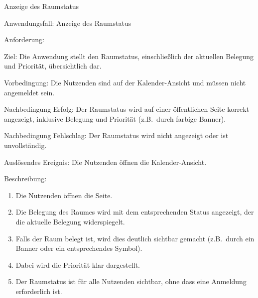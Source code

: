 \begin{function}{80}{Anzeige des Raumstatus}
    \item[Anwendungsfall:] Anzeige des Raumstatus
    \item[Anforderung:] 
    \item[Ziel:] Die Anwendung stellt den Raumstatus, einschließlich der aktuellen Belegung und Priorität, übersichtlich dar.
    \item[Vorbedingung:] Die Nutzenden sind auf der Kalender-Ansicht und müssen nicht angemeldet sein.
    \item[Nachbedingung Erfolg:] Der Raumstatus wird auf einer öffentlichen Seite korrekt angezeigt, inklusive Belegung und Priorität (z.B.\ durch farbige Banner).
    \item[Nachbedingung Fehlschlag:] Der Raumstatus wird nicht angezeigt oder ist unvollständig.
    \item[Auslösendes Ereignis:] Die Nutzenden öffnen die Kalender-Ansicht.
    \item[Beschreibung:] ~
    \begin{enumerate}
        \item Die Nutzenden öffnen die Seite.
        \item Die Belegung des Raumes wird mit dem entsprechenden Status angezeigt, der die aktuelle Belegung widerspiegelt.
        \item Falls der Raum belegt ist, wird dies deutlich sichtbar gemacht (z.B.\ durch ein Banner oder ein entsprechendes Symbol).
        \item Dabei wird die Priorität klar dargestellt.
        \item Der Raumstatus ist für alle Nutzenden sichtbar, ohne dass eine Anmeldung erforderlich ist.
    \end{enumerate}
\end{function}

\pagebreak

